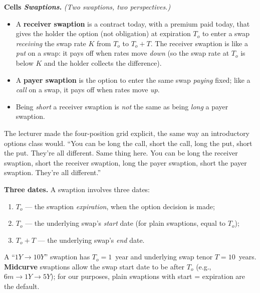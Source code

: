 \begin{keyblock}
\textbf{Cells \emph{Swaptions}.}
\emph{(Two swaptions, two perspectives.)}
\begin{itemize}
  \item A \textbf{receiver swaption} is a contract today, with a
        premium paid today, that gives the holder the option (not
        obligation) at expiration $T_o$ to enter a swap
        \emph{receiving} the swap rate $K$ from $T_o$ to $T_o + T$.
        The receiver swaption is like a \emph{put} on a swap: it
        pays off when rates move \emph{down} (so the swap rate at
        $T_o$ is below $K$ and the holder collects the difference).
  \item A \textbf{payer swaption} is the option to enter the same
        swap \emph{paying} fixed; like a \emph{call} on a swap, it
        pays off when rates move \emph{up}.
  \item Being \emph{short} a receiver swaption is \emph{not} the same
        as being \emph{long} a payer swaption.
\end{itemize}
\end{keyblock}

The lecturer made the four-position grid explicit, the same way an
introductory options class would. ``You can be long the call, short
the call, long the put, short the put. They're all different. Same
thing here. You can be long the receiver swaption, short the receiver
swaption, long the payer swaption, short the payer swaption. They're
all different.''

\begin{keyblock}
\textbf{Three dates.}
A swaption involves three dates:
\begin{enumerate}[label=(\arabic*)]
  \item $T_o$ --- the swaption \emph{expiration}, when the option
        decision is made;
  \item $T_o$ --- the underlying swap's \emph{start} date (for plain
        swaptions, equal to $T_o$);
  \item $T_o + T$ --- the underlying swap's \emph{end} date.
\end{enumerate}
A ``$1Y \to 10Y$'' swaption has $T_o = 1$~year and underlying swap
tenor $T = 10$~years. \\
\textbf{Midcurve} swaptions allow the swap start date to be after
$T_o$ (e.g., $6m \to 1Y \to 5Y$); for our purposes, plain swaptions
with start = expiration are the default.
\end{keyblock}

